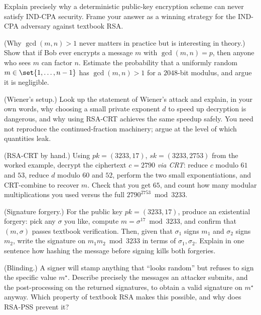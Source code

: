 \begin{exercise}
Explain precisely why a deterministic public-key encryption scheme can never satisfy IND-CPA security. Frame your answer as a winning strategy for the IND-CPA adversary against textbook RSA.
\end{exercise}

\begin{exercise}
(Why $\gcd(m,n)>1$ never matters in practice but is interesting in theory.) Show that if Bob ever encrypts a message $m$ with $\gcd(m,n)=p$, then anyone who sees $m$ can factor $n$. Estimate the probability that a uniformly random $m\in\set{1,\dots,n-1}$ has $\gcd(m,n)>1$ for a $2048$-bit modulus, and argue it is negligible.
\end{exercise}

\begin{exercise}
(Wiener's setup.) Look up the statement of Wiener's attack and explain, in your own words, why choosing a small private exponent $d$ to speed up decryption is dangerous, and why using RSA-CRT achieves the same speedup safely. You need not reproduce the continued-fraction machinery; argue at the level of which quantities leak.
\end{exercise}

\begin{exercise}
(RSA-CRT by hand.) Using $pk=(3233,17)$, $sk=(3233,2753)$ from the worked example, decrypt the ciphertext $c=2790$ \emph{via CRT}: reduce $c$ modulo $61$ and $53$, reduce $d$ modulo $60$ and $52$, perform the two small exponentiations, and CRT-combine to recover $m$. Check that you get $65$, and count how many modular multiplications you used versus the full $2790^{2753}\bmod 3233$.
\end{exercise}

\begin{exercise}
(Signature forgery.) For the public key $pk=(3233,17)$, produce an existential forgery: pick any $\sigma$ you like, compute $m=\sigma^{17}\bmod 3233$, and confirm that $(m,\sigma)$ passes textbook verification. Then, given that $\sigma_1$ signs $m_1$ and $\sigma_2$ signs $m_2$, write the signature on $m_1 m_2 \bmod 3233$ in terms of $\sigma_1,\sigma_2$. Explain in one sentence how hashing the message before signing kills both forgeries.
\end{exercise}

\begin{exercise}
(Blinding.) A signer will stamp anything that ``looks random'' but refuses to sign the specific value $m^\star$. Describe precisely the messages an attacker submits, and the post-processing on the returned signatures, to obtain a valid signature on $m^\star$ anyway. Which property of textbook RSA makes this possible, and why does RSA-PSS prevent it?
\end{exercise}
